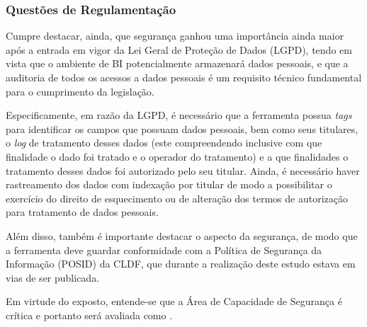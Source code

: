 


\subsubsection*{Questões de Regulamentação}

Cumpre destacar, ainda, que segurança ganhou uma importância ainda maior após a entrada em vigor da Lei Geral de Proteção de Dados (LGPD), tendo em vista que o ambiente de BI potencialmente armazenará dados pessoais, e que a auditoria de todos os acessos a dados pessoais é um requisito técnico fundamental para o cumprimento da legislação. 


Especificamente, em razão da LGPD, é necessário que a ferramenta possua \emph{tags} para identificar os campos que possuam dados pessoais, bem como seus titulares, o \emph{log} de tratamento desses dados (este compreendendo inclusive com que finalidade o dado foi tratado e o operador do tratamento) e a que finalidades o tratamento desses dados foi autorizado pelo seu titular. Ainda, é necessário haver rastreamento dos dados com indexação por titular de modo a possibilitar o exercício do direito de esquecimento ou de alteração dos termos de autorização para tratamento de dados pessoais.

Além disso, também é importante destacar o aspecto da segurança, de modo que a ferramenta deve guardar conformidade com a Política de Segurança da Informação (POSID) da CLDF, que durante a realização deste estudo estava em vias de ser publicada.


Em virtude do exposto, entende-se que a Área de Capacidade de Segurança é crítica e portanto será avaliada como \MUST.